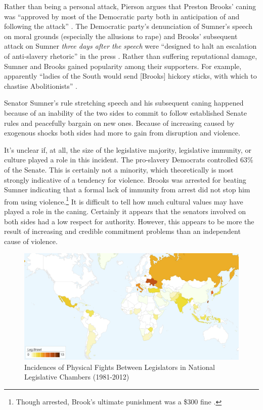 \documentclass[a4paper]{article}\usepackage[]{graphicx}\usepackage[]{color}
\begin{document}
Rather than being a personal attack, Pierson argues that Preston Brooks' caning was ``approved by most of the Democratic party both in anticipation of and following the attack'' \cite[553]{Pierson1995}. The Democratic party's denunciation of Sumner's speech on moral grounds (especially the allusions to rape) and Brooks' subsequent attack on Sumner \emph{three days after the speech} were ``designed to halt an escalation of anti-slavery rhetoric'' in the press \cite[553]{Pierson1995}. Rather than suffering reputational damage, Sumner and Brooks gained popularity among their supporters. For example, apparently ``ladies of the South would send [Brooks] hickory sticks, with which to chastise Abolitionists'' \cite[255]{Donald2009}.

Senator Sumner's rule stretching speech and his subsequent caning happened because of an inability of the two sides to commit to follow established Senate rules and peacefully bargain on new ones. Because of increasing  caused by exogenous shocks both sides had more to gain from disruption and violence.

It's unclear if, at all, the size of the legislative majority, legislative immunity, or culture played a role in this incident. The pro-slavery Democrats controlled 63\% of the Senate. This is certainly not a minority, which theoretically is most strongly indicative of a tendency for violence. Brooks was arrested for beating Sumner indicating that a formal lack of immunity from arrest did not stop him from using violence.\footnote{Though arrested, Brook's ultimate punishment was a \$300 fine \cite[59]{Wolfe2004}.} It is difficult to tell how much cultural values may have played a role in the caning. Certainly it appears that the senators involved on both sides had a low respect for authority. However, this appears to be more the result of increasing  and credible commitment problems than an independent cause of violence.

\begin{figure}[h!]
    \centering

        \includegraphics[width = 13cm]{incidence_map.png}

        \caption{Incidences of Physical Fights Between Legislators in  National Legislative Chambers (1981-2012)}
        \label{leg_map}

\end{figure}
\end{document}
